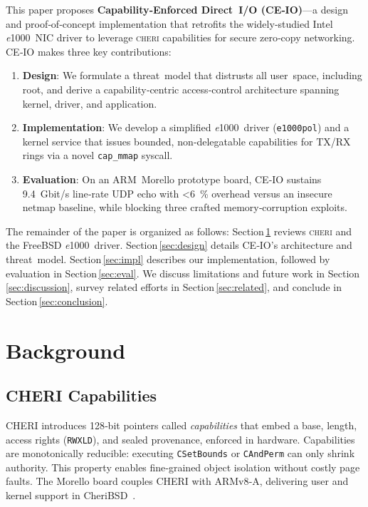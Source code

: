 \documentclass[sigconf]{acmart}
\newcommand{\cheri}{\textsc{cheri}\xspace}
\newcommand{\e}{\textit{e}1000\xspace}
\begin{document}
This paper proposes \textbf{Capability‑Enforced Direct I/O (CE‑IO)}—a design and proof‑of‑concept implementation that retrofits the widely‑studied Intel \e NIC driver to leverage \cheri capabilities for secure zero‑copy networking. CE‑IO makes three key contributions:  
\begin{enumerate}
    \item \textbf{Design}: We formulate a threat model that distrusts all user space, including root, and derive a capability‑centric access‑control architecture spanning kernel, driver, and application.  
    \item \textbf{Implementation}: We develop a simplified \e driver (\texttt{e1000pol}) and a kernel service that issues bounded, non‑delegatable capabilities for TX/RX rings via a novel \texttt{cap\_mmap} syscall.  
    \item \textbf{Evaluation}: On an ARM Morello prototype board, CE‑IO sustains 9.4 Gbit/s line‑rate UDP echo with \textless6 \% overhead versus an insecure netmap baseline, while blocking three crafted memory‑corruption exploits.  
\end{enumerate}

\noindent The remainder of the paper is organized as follows: Section\,\ref{sec:background} reviews \cheri and the FreeBSD \e driver. Section\,\ref{sec:design} details CE‑IO’s architecture and threat model. Section\,\ref{sec:impl} describes our implementation, followed by evaluation in Section\,\ref{sec:eval}. We discuss limitations and future work in Section\,\ref{sec:discussion}, survey related efforts in Section\,\ref{sec:related}, and conclude in Section\,\ref{sec:conclusion}.

\section{Background}
\label{sec:background}
\subsection{CHERI Capabilities}
CHERI introduces 128‑bit pointers called \emph{capabilities} that embed a base, length, access rights (\texttt{RWXLD}), and sealed provenance, enforced in hardware. Capabilities are monotonically reducible: executing \texttt{CSetBounds} or \texttt{CAndPerm} can only shrink authority. This property enables fine‑grained object isolation without costly page faults. The Morello board couples CHERI with ARMv8‑A, delivering user and kernel support in CheriBSD \cite{cheribsd}.  
\end{document}
